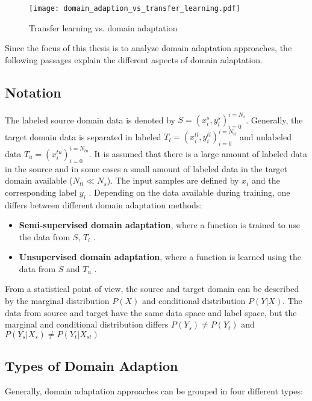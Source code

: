 \begin{figure}[H]
  \centering
  \texttt{[image: domain\_adaption\_vs\_transfer\_learning.pdf]}
  \caption {Transfer learning vs. domain adaptation} \label{fig:domain_adaption_vs_transfer_learning}
\end{figure}


Since the focus of this thesis is to analyze domain adaptation approaches, the following passages explain the different aspects of domain adaptation.
\subsection{Notation}
The labeled source domain data is denoted by  $S = {(x_{i}^{s}, y_{i}^{s})_{i = 0}^{i = N_{s}}}$. Generally, the target domain data is separated in labeled $T_{l} = {(x_{i}^{tl}, y_{i}^{tl})_{i = 0}^{i = N_{tl}}}$ and unlabeled data $T_{u} = {(x_{i}^{tu})_{i = 0}^{i = N_{tu}}}$. It is assumed that there is a large amount of labeled data in the source and in some cases a small amount of labeled data in the target domain available ($N_{tl} \ll N_{s}$). The input samples are defined by $x_{i}$ and the corresponding label $y_{i}$  \cite{Patel2015}. Depending on the data available during training, one differs between different domain adaptation methods: 
\begin{itemize}
\item \textbf{Semi-supervised domain adaptation}, where a function is trained to use the data from $S$, $T_{l}$ \cite{Patel2015}. 
\item \textbf{Unsupervised domain adaptation}, where a function is learned using the data from $S$ and $T_{u}$ \cite{Patel2015}.
\end{itemize}

From a statistical point of view, the source and target domain can be described by the marginal distribution $P(X)$ and conditional distribution $P(Y|X)$. The data from source and target have the same data space and label space, but the marginal and conditional distribution differs $P(Y_{s}) \neq P(Y_{t})$ and $P(Y_{s}|X_{s}) \neq P(Y_{t}|X_{st})$ \cite{Qikang2020}

\subsection{Types of Domain Adaption}
Generally, domain adaptation approaches can be grouped in four different types:  

